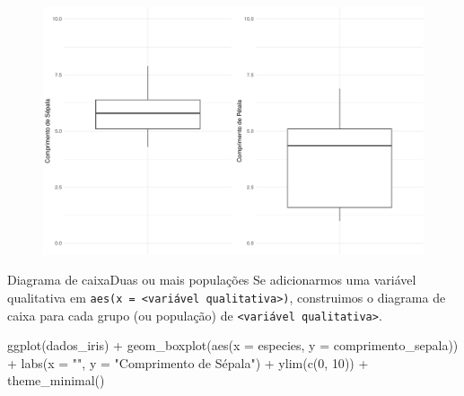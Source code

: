 \documentclass[
  10pt,
  ignorenonframetext,
]{beamer}
\newenvironment{Shaded}{\begin{snugshade}}{\end{snugshade}}
\newcommand{\AttributeTok}[1]{\textcolor[rgb]{0.40,0.45,0.13}{#1}}
\newcommand{\DecValTok}[1]{\textcolor[rgb]{0.68,0.00,0.00}{#1}}
\newcommand{\FunctionTok}[1]{\textcolor[rgb]{0.28,0.35,0.67}{#1}}
\newcommand{\NormalTok}[1]{\textcolor[rgb]{0.00,0.23,0.31}{#1}}
\newcommand{\SpecialCharTok}[1]{\textcolor[rgb]{0.37,0.37,0.37}{#1}}
\newcommand{\StringTok}[1]{\textcolor[rgb]{0.13,0.47,0.30}{#1}}
\begin{document}
\begin{frame}
\begin{figure}

{\centering \includegraphics[width=1\textwidth,height=\textheight]{exploracao-visualizacao_files/figure-beamer/unnamed-chunk-97-1.pdf}

}

\end{figure}
\end{frame}

\begin{frame}[fragile]{Diagrama de caixa\newline Duas ou mais
populações}
\protect\hypertarget{diagrama-de-caixaduas-ou-mais-populauxe7uxf5es}{}
Se adicionarmos uma variável qualitativa em
\texttt{aes(x\ =\ \textless{}variável\ qualitativa\textgreater{})},
construimos o diagrama de caixa para cada grupo (ou população) de
\texttt{\textless{}variável\ qualitativa\textgreater{}}.

\vfill

\begin{Shaded}
\begin{Highlighting}[]
\FunctionTok{ggplot}\NormalTok{(dados\_iris) }\SpecialCharTok{+}
  \FunctionTok{geom\_boxplot}\NormalTok{(}\FunctionTok{aes}\NormalTok{(}\AttributeTok{x =}\NormalTok{ especies, }\AttributeTok{y =}\NormalTok{ comprimento\_sepala)) }\SpecialCharTok{+}
  \FunctionTok{labs}\NormalTok{(}\AttributeTok{x =} \StringTok{""}\NormalTok{, }\AttributeTok{y =} \StringTok{"Comprimento de Sépala"}\NormalTok{) }\SpecialCharTok{+}
  \FunctionTok{ylim}\NormalTok{(}\FunctionTok{c}\NormalTok{(}\DecValTok{0}\NormalTok{, }\DecValTok{10}\NormalTok{)) }\SpecialCharTok{+}
  \FunctionTok{theme\_minimal}\NormalTok{()}
\end{Highlighting}
\end{Shaded}
\end{frame}
\end{document}
